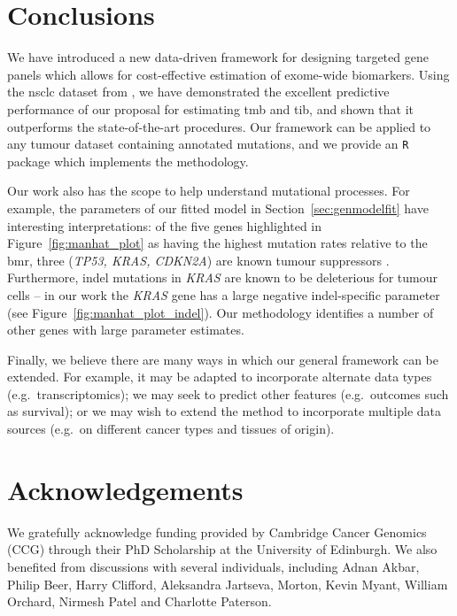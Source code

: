 \documentclass[12pt]{article}
\begin{document}
\section{Conclusions \label{sec:conclusion}}
 We have introduced a new data-driven framework for designing targeted gene panels which allows for cost-effective estimation of exome-wide biomarkers.  Using the \acrlong{nsclc} dataset from \citet{campbell_distinct_2016}, we have demonstrated the excellent predictive performance of our proposal for estimating \acrlong{tmb} and \acrlong{tib}, and shown that it outperforms the state-of-the-art procedures. Our framework can be applied to any tumour dataset containing annotated mutations, and we provide an \texttt{R} package \citep{bradley_icbiomark_2021} which implements the methodology.
 
Our work also has the scope to help understand mutational processes. For example, the parameters of our fitted model in Section~\ref{sec:genmodelfit} have interesting interpretations: of the five genes highlighted in Figure~\ref{fig:manhat_plot} as having the highest mutation rates relative to the \gls{bmr}, three (\textit{TP53, KRAS, CDKN2A}) are known tumour suppressors \citep{olivier_tp53_2010, jancik_clinical_2010, foulkes_cdkn2a_1997}.  Furthermore, indel mutations in \textit{KRAS} are known to be deleterious for tumour cells \citep{lee_selective_2018} -- in our work the \textit{KRAS} gene has a large negative indel-specific parameter (see Figure~\ref{fig:manhat_plot_indel}).  Our methodology identifies a number of other genes with large parameter estimates.

Finally, we believe there are many ways in which our general framework can be extended. For example, it may be adapted to incorporate alternate data types (e.g.~transcriptomics); we may seek to predict other features (e.g.~outcomes such as survival); or we may wish to extend the method to incorporate multiple data sources (e.g.~on different cancer types and tissues of origin). 

\section{Acknowledgements}
We gratefully acknowledge funding provided by Cambridge Cancer Genomics (CCG) through their PhD Scholarship at the University of Edinburgh. We also benefited from discussions with several individuals, including Adnan Akbar, Philip Beer, Harry Clifford, Aleksandra Jartseva, Morton, Kevin Myant, William Orchard, Nirmesh Patel and Charlotte Paterson.




\end{document}

